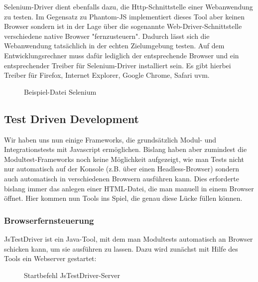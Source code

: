 Selenium-Driver dient ebenfalls dazu, die Http-Schnittstelle einer Webanwendung zu testen. Im Gegensatz zu Phantom-JS implementiert dieses Tool aber keinen Browser sondern ist in der Lage über die sogenannte Web-Driver-Schnittstelle verschiedene native Browser "fernzusteuern". Dadurch lässt sich die Webanwendung tatsächlich in der echten Zielumgebung testen. Auf dem Entwicklungsrechner muss dafür lediglich der entsprechende Browser und ein entsprechender Treiber für Selenium-Driver installiert sein. Es gibt hierbei Treiber für Firefox, Internet Explorer, Google Chrome, Safari uvm.

\begin{figure}[H]
	\begin{center}
		\caption{Beispiel-Datei Selenium}
		\label{code:selenium}
	\end{center}
\end{figure}

\subsection{Test Driven Development}

Wir haben uns nun einige Frameworks, die grundsätzlich Modul- und Integrationstests mit Javascript ermöglichen. Bislang haben aber zumindest die Modultest-Frameworks noch keine Möglichkeit aufgezeigt, wie man Tests nicht nur automatisch auf der Konsole (z.B. über einen Headless-Browser) sondern auch automatisch in verschiedenen Browsern ausführen kann. Dies erforderte bislang immer das anlegen einer HTML-Datei, die man manuell in einem Browser öffnet. Hier kommen nun Tools ins Spiel, die genau diese Lücke füllen können.

\subsubsection{Browserfernsteuerung}

JsTestDriver ist ein Java-Tool, mit dem man Modultests automatisch an Browser schicken kann, um sie ausführen zu lassen. Dazu wird zunächst mit Hilfe des Tools ein Webserver gestartet:

\begin{figure}[H]
	\begin{center}
		\caption{Startbefehl JsTestDriver-Server}
		\label{bash:jstestdriver}
	\end{center}
\end{figure}

